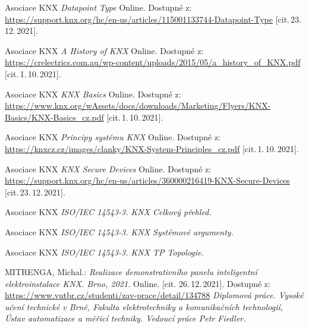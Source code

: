 
\begin{thebibliography}{99}

    	Asociace KNX \emph{Datapoint Type}\/ Online. 
    	Dostupné z:
    \url{https://support.knx.org/hc/en-us/articles/115001133744-Datapoint-Type}
    [cit.\,23.\,12.\,2021]. 
    
		Asociace KNX 
		\emph{A History of KNX}\/ Online.
		Dostupné z:
    \url{https://crelectrics.com.au/wp-content/uploads/2015/05/a_history_of_KNX.pdf}  
    [cit.\,1.\,10.\,2021]. 
    
		Asociace KNX
		\emph{KNX Basics}\/ Online.
		Dostupné z:
    \url{https://www.knx.org/wAssets/docs/downloads/Marketing/Flyers/KNX-Basics/KNX-Basics_cz.pdf} 
		[cit.\,1.\,10.\,2021].
    
    	Asociace KNX \emph{Principy systému KNX}\/ Online. 
    	Dostupné z:
    \url{https://knxcz.cz/images/clanky/KNX-System-Principles_cz.pdf} 
    	[cit.\,1.\,10.\,2021].
    
    	Asociace KNX \emph{KNX Secure Devices}\/ Online. 
    	Dostupné z:
    \url{https://support.knx.org/hc/en-us/articles/360000216419-KNX-Secure-Devices} 
    	[cit.\,23.\,12.\,2021].
    
    Asociace KNX \emph{ISO/IEC 14543-3. KNX Celkový přehled.}
    
    Asociace KNX \emph{ISO/IEC 14543-3. KNX Systémové argumenty.}
    
    Asociace KNX \emph{ISO/IEC 14543-3. KNX TP Topologie.}
    
    MITRENGA, Michal.:
    \emph{Realizace demonstrativního panelu inteligentní elektroinstalace KNX. Brno, 2021.}\/ Online. 
    [cit. 26.\,12.\,2021].
    Dostupné z:
    \url{https://www.vutbr.cz/studenti/zav-prace/detail/134788}
    \emph{Diplomová práce. Vysoké učení technické v Brně, Fakulta elektrotechniky a komunikačních technologií, Ústav automatizace a měřicí techniky. Vedoucí práce Petr Fiedler.}
 


\end{thebibliography}
